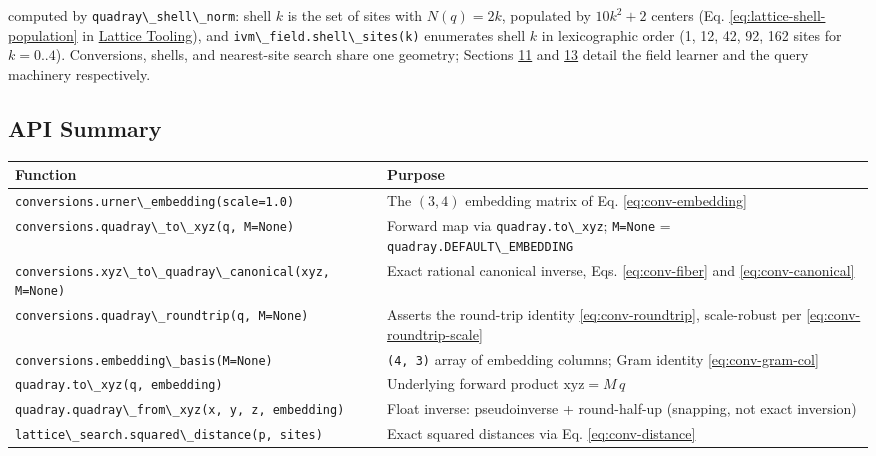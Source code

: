 \documentclass[
  10pt,
]{article}
\newcommand{\passthrough}[1]{#1}
\newcounter{none} %
\begin{document}
computed by \passthrough{\lstinline!quadray\_shell\_norm!}: shell \(k\)
is the set of sites with \(N(q) = 2k\), populated by \(10k^2 + 2\)
centers (Eq. \eqref{eq:lattice-shell-population} in
\href{13_lattice_tooling.md}{Lattice Tooling}), and
\passthrough{\lstinline!ivm\_field.shell\_sites(k)!} enumerates shell
\(k\) in lexicographic order (1, 12, 42, 92, 162 sites for
\(k = 0..4\)). Conversions, shells, and nearest-site search share one
geometry; Sections \href{11_ivm_field_learning.md}{11} and
\href{13_lattice_tooling.md}{13} detail the field learner and the query
machinery respectively.

\subsection{API Summary}\label{api-summary}

{\def\LTcaptype{none} %
\begin{longtable}[]{@{}
  >{\raggedright\arraybackslash}p{}
  >{\raggedright\arraybackslash}p{}@{}}
\toprule\noalign{}
\begin{minipage}[b]{\linewidth}\raggedright
Function
\end{minipage} & \begin{minipage}[b]{\linewidth}\raggedright
Purpose
\end{minipage} \\
\midrule\noalign{}
\endhead
\bottomrule\noalign{}
\endlastfoot
\passthrough{\lstinline!conversions.urner\_embedding(scale=1.0)!} & The
\((3, 4)\) embedding matrix of Eq. \eqref{eq:conv-embedding} \\
\passthrough{\lstinline!conversions.quadray\_to\_xyz(q, M=None)!} &
Forward map via \passthrough{\lstinline!quadray.to\_xyz!};
\passthrough{\lstinline!M=None!} =
\passthrough{\lstinline!quadray.DEFAULT\_EMBEDDING!} \\
\passthrough{\lstinline!conversions.xyz\_to\_quadray\_canonical(xyz, M=None)!}
& Exact rational canonical inverse, Eqs. \eqref{eq:conv-fiber} and
\eqref{eq:conv-canonical} \\
\passthrough{\lstinline!conversions.quadray\_roundtrip(q, M=None)!} &
Asserts the round-trip identity \eqref{eq:conv-roundtrip}, scale-robust
per \eqref{eq:conv-roundtrip-scale} \\
\passthrough{\lstinline!conversions.embedding\_basis(M=None)!} &
\passthrough{\lstinline!(4, 3)!} array of embedding columns; Gram
identity \eqref{eq:conv-gram-col} \\
\passthrough{\lstinline!quadray.to\_xyz(q, embedding)!} & Underlying
forward product \(\mathrm{xyz} = M\,q\) \\
\passthrough{\lstinline!quadray.quadray\_from\_xyz(x, y, z, embedding)!}
& Float inverse: pseudoinverse + round-half-up (snapping, not exact
inversion) \\
\passthrough{\lstinline!lattice\_search.squared\_distance(p, sites)!} &
Exact squared distances via Eq. \eqref{eq:conv-distance} \\
\end{longtable}
}
\end{document}

